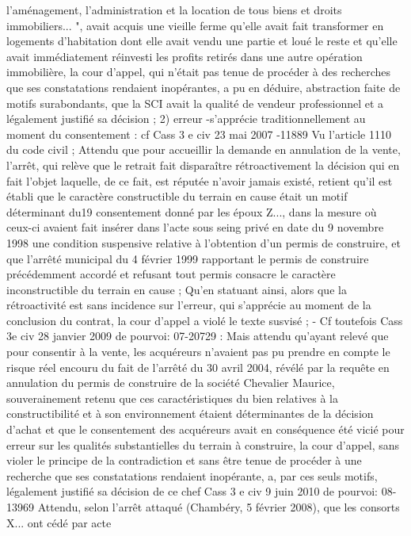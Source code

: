 \documentclass[11pt,a4paper]{report}
\begin{document}
	l'aménagement, l'administration et la location de tous biens et droits immobiliers... ", avait acquis une
	vieille ferme qu'elle avait fait transformer en logements d'habitation dont elle avait vendu une partie et loué
	le reste et qu'elle avait immédiatement réinvesti les profits retirés dans une autre opération immobilière, la
	cour d'appel, qui n'était pas tenue de procéder à des recherches que ses constatations rendaient
	inopérantes, a pu en déduire, abstraction faite de motifs surabondants, que la SCI avait la qualité de
	vendeur professionnel et a légalement justifié sa décision ;
	2) erreur
	-s’apprécie traditionnellement au moment du consentement : cf Cass 3 e civ 23 mai 2007 -11889
	Vu l'article 1110 du code civil ;
	Attendu que pour accueillir la demande en annulation de la vente, l'arrêt, qui relève que le retrait fait
	disparaître rétroactivement la décision qui en fait l'objet laquelle, de ce fait, est réputée n'avoir jamais
	existé, retient qu'il est établi que le caractère constructible du terrain en cause était un motif déterminant du19
	consentement donné par les époux Z..., dans la mesure où ceux-ci avaient fait insérer dans l'acte sous seing
	privé en date du 9 novembre 1998 une condition suspensive relative à l'obtention d'un permis de construire,
	et que l'arrêté municipal du 4 février 1999 rapportant le permis de construire précédemment accordé et
	refusant tout permis consacre le caractère inconstructible du terrain en cause ;
	Qu'en statuant ainsi, alors que la rétroactivité est sans incidence sur l'erreur, qui s'apprécie au moment
	de la conclusion du contrat, la cour d'appel a violé le texte susvisé ;
	- Cf toutefois Cass 3e civ 28 janvier 2009 \No  de pourvoi: 07-20729 : Mais attendu qu'ayant relevé que pour
	consentir à la vente, les acquéreurs n'avaient pas pu prendre en compte le risque réel encouru du fait de
	l'arrêté du 30 avril 2004, révélé par la requête en annulation du permis de construire de la société Chevalier
	Maurice, souverainement retenu que ces caractéristiques du bien relatives à la constructibilité et à son
	environnement étaient déterminantes de la décision d'achat et que le consentement des acquéreurs avait en
	conséquence été vicié pour erreur sur les qualités substantielles du terrain à construire, la cour d'appel, sans
	violer le principe de la contradiction et sans être tenue de procéder à une recherche que
	ses
	constatations rendaient inopérante, a, par ces seuls motifs, légalement justifié sa décision de ce chef
	Cass 3 e civ 9 juin 2010 \No  de pourvoi: 08-13969
	Attendu, selon l'arrêt attaqué (Chambéry, 5 février 2008), que les consorts X... ont cédé par acte
\end{document}
